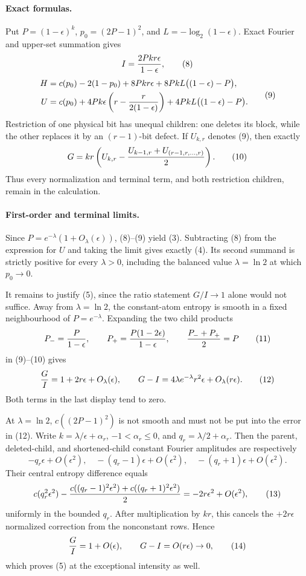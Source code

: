 \paragraph{Exact formulas.}
Put $P=(1-\epsilon)^k$, $p_0=(2P-1)^2$, and
$L=-\log_2(1-\epsilon)$.  Exact Fourier and upper-set summation gives
\[
 I={2Pkr\epsilon\over1-\epsilon},                                 \tag{8}
\]
\[
 \begin{aligned}
 H={}&c(p_0)-2(1-p_0)+8Pkr\epsilon
       +8PkL\bigl((1-\epsilon)-P\bigr),\\
 U={}&c(p_0)+4Pk\epsilon
       \left(r-{r\over2(1-\epsilon)}\right)
       +4PkL\bigl((1-\epsilon)-P\bigr).
 \end{aligned}                                                    \tag{9}
\]
Restriction of one physical bit has unequal children: one deletes its
block, while the other replaces it by an $(r-1)$-bit defect.  If
$U_{k,r}$ denotes (9), then exactly
\[
 G=kr\left(U_{k,r}
 -{U_{k-1,r}+U_{(r-1,r,\ldots,r)}\over2}\right).                 \tag{10}
\]
Thus every normalization and terminal term, and both restriction
children, remain in the calculation.

\paragraph{First-order and terminal limits.}
Since $P=e^{-\lambda}(1+O_\lambda(\epsilon))$, (8)--(9) yield (3).
Subtracting (8) from the expression for $U$ and taking the limit gives
exactly (4).  Its second summand is strictly positive for every
$\lambda>0$, including the balanced value $\lambda=\ln2$ at which
$p_0\to0$.

It remains to justify (5), since the ratio statement $G/I\to1$ alone
would not suffice.  Away from $\lambda=\ln2$, the constant-atom entropy
is smooth in a fixed neighbourhood of $P=e^{-\lambda}$.  Expanding the
two child products
\[
 P_-={P\over1-\epsilon},\qquad
 P_+={P(1-2\epsilon)\over1-\epsilon},\qquad
 {P_-+P_+\over2}=P                                      \tag{11}
\]
in (9)--(10) gives
\[
 {G\over I}=1+2r\epsilon+O_\lambda(\epsilon),
 \qquad
 G-I=4\lambda e^{-\lambda}r^2\epsilon+O_\lambda(r\epsilon).
 \tag{12}
\]
Both terms in the last display tend to zero.

At $\lambda=\ln2$, $c((2P-1)^2)$ is not smooth and must not be put into
the error in (12).  Write
$k=\lambda/\epsilon+\alpha_r$, $-1<\alpha_r\le0$, and
$q_r=\lambda/2+\alpha_r$.  Then the parent, deleted-child, and
shortened-child constant Fourier amplitudes are respectively
\[
 -q_r\epsilon+O(\epsilon^2),\quad
 -(q_r-1)\epsilon+O(\epsilon^2),\quad
 -(q_r+1)\epsilon+O(\epsilon^2).
\]
Their central entropy difference equals
\[
 c(q_r^2\epsilon^2)
 -{c((q_r-1)^2\epsilon^2)+c((q_r+1)^2\epsilon^2)\over2}
 =-2r\epsilon^2+O(\epsilon^2),                         \tag{13}
\]
uniformly in the bounded $q_r$.  After multiplication by $kr$, this
cancels the $+2r\epsilon$ normalized correction from the nonconstant
rows.  Hence
\[
 {G\over I}=1+O(\epsilon),\qquad G-I=O(r\epsilon)\to0,             \tag{14}
\]
which proves (5) at the exceptional intensity as well.


